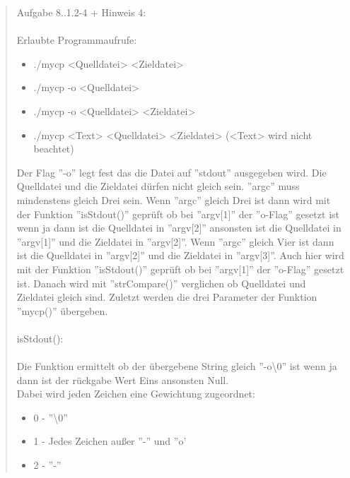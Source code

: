 \begin{quote}
			Aufgabe 8..1.2-4 + Hinweis 4:\\ \\
			\small
			\normalsize Erlaubte Programmaufrufe:\\
			\begin{itemize}
				\item ./mycp <Quelldatei> <Zieldatei>\\
				\item ./mycp -o <Quelldatei>\\
				\item ./mycp -o <Quelldatei> <Zieldatei>\\
				\item ./mycp <Text> <Quelldatei> <Zieldatei> (<Text> wird nicht beachtet)\\
			\end{itemize}
			Der Flag ''-o'' legt fest das die Datei auf ''stdout'' ausgegeben wird. Die Quelldatei und die Zieldatei d\"urfen nicht gleich sein. ''argc'' muss mindenstens gleich Drei sein. Wenn ''argc'' gleich Drei ist dann wird mit der Funktion ''isStdout()'' gepr\"uft ob bei ''argv[1]'' der ''o-Flag'' gesetzt ist wenn ja dann ist die Quelldatei in ''argv[2]'' ansonsten ist die Quelldatei in ''argv[1]'' und die Zieldatei in ''argv[2]''. Wenn ''argc'' gleich Vier ist dann ist die Quelldatei in ''argv[2]'' und die Zieldatei in ''argv[3]''. Auch hier wird mit der Funktion ''isStdout()'' gepr\"uft ob bei ''argv[1]'' der ''o-Flag'' gesetzt ist. Danach wird mit ''strCompare()'' verglichen ob Quelldatei und Zieldatei gleich sind. Zuletzt werden die drei Parameter der Funktion ''mycp()'' \"ubergeben.\\ \\
			isStdout():\\ \\
			\small
			\normalsize	Die Funktion ermittelt ob der \"ubergebene String gleich ''-o\textbackslash 0'' ist wenn ja dann ist der r\"uckgabe Wert Eins ansonsten Null.\\
			Dabei wird jeden Zeichen eine Gewichtung zugeordnet:\\
			\begin{itemize}
				\item 0 - ''\textbackslash 0''\\
				\item 1 - Jedes Zeichen außer ''-'' und ''o'\\ 
				\item 2 - ''-''\\

\end{itemize}
\end{quote}
